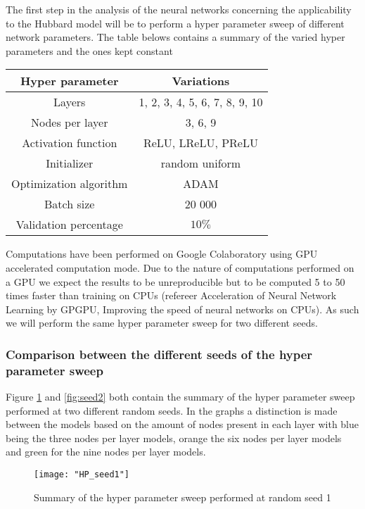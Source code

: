 \documentclass[12pt]{article}
\begin{document}
The first step in the analysis of the neural networks concerning the applicability to the Hubbard model will be to perform a hyper parameter sweep of different network parameters. The table belows contains a summary of the varied hyper parameters and the ones kept constant
\begin{center}
	\begin{tabular}{|c|c|}
		\hline
		Hyper parameter & Variations \\
		\hline
		Layers & 1, 2, 3, 4, 5, 6, 7, 8, 9, 10 \\
		Nodes per layer & 3, 6, 9 \\
		Activation function & ReLU, LReLU, PReLU \\
		Initializer & random uniform \\
		Optimization algorithm & ADAM \\
		Batch size & 20 000 \\
		Validation percentage & $10\%$ \\ 
		\hline 
	\end{tabular}
\end{center}

Computations have been performed on Google Colaboratory using GPU accelerated computation mode. Due to the nature of computations performed on a GPU we expect the results to be unreproducible but to be computed 5 to 50 times faster than training on CPUs (refereer Acceleration of Neural Network Learning by GPGPU, Improving the speed of neural networks on CPUs). As such we will perform the same hyper parameter sweep for two different seeds.

\subsubsection{Comparison between the different seeds of the hyper parameter sweep}

Figure \ref{fig:seed1} and \ref{fig:seed2} both contain the summary of the hyper parameter sweep performed at two different random seeds. In the graphs a distinction is made between the models based on the amount of nodes present in each layer with blue being the three nodes per layer models, orange the six nodes per layer models and green for the nine nodes per layer models. 

\begin{figure}[H]
	\centering
	\texttt{[image: "HP\_seed1"]}
	\caption{Summary of the hyper parameter sweep performed at random seed 1}
	\label{fig:seed1}
\end{figure}
\end{document}

